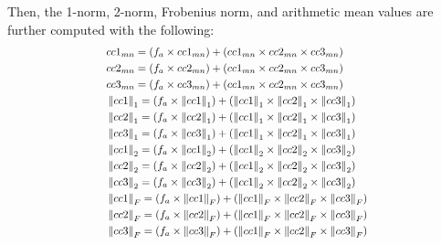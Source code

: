 \documentclass[superscriptaddress,longbibliography,aps,prl,twocolumn,10pt]{revtex4-2}
\newcommand{\norm}[1]{\left\lVert#1\right\rVert}
\begin{document}
\noindent
Then, the 1-norm, 2-norm, Frobenius norm, and arithmetic mean values are further computed with the following:
    \begin{equation} \label{eq:altogether}
    \scalebox{0.85}{\(\displaystyle
    \begin{aligned}
        &cc1_{mn} = \left( f_{a} \times cc1_{mn} \right) + \left( cc1_{mn} \times cc2_{mn} \times cc3_{mn} \right) \\ 
        &cc2_{mn} = \left( f_{a} \times cc2_{mn} \right) + \left( cc1_{mn} \times cc2_{mn} \times cc3_{mn} \right) \\
        &cc3_{mn} = \left( f_{a} \times cc3_{mn} \right) + \left( cc1_{mn} \times cc2_{mn} \times cc3_{mn} \right) \\
        &\norm{cc1}_{1} = \left( f_{a} \times \norm{cc1}_{1} \right) + \left( \norm{cc1}_{1} \times \norm{cc2}_{1} \times \norm{cc3}_{1} \right) \\ 
        &\norm{cc2}_{1} = \left( f_{a} \times \norm{cc2}_{1} \right) + \left( \norm{cc1}_{1} \times \norm{cc2}_{1} \times \norm{cc3}_{1} \right) \\
        &\norm{cc3}_{1} = \left( f_{a} \times \norm{cc3}_{1} \right) + \left( \norm{cc1}_{1} \times \norm{cc2}_{1} \times \norm{cc3}_{1} \right) \\
        &\norm{cc1}_{2} = \left(f_{a} \times \norm{cc1}_{2} \right) + \left( \norm{cc1}_{2} \times \norm{cc2}_{2} \times \norm{cc3}_{2} \right) \\ 
        &\norm{cc2}_{2} = \left( f_{a} \times \norm{cc2}_{2} \right) + \left( \norm{cc1}_{2} \times \norm{cc2}_{2} \times \norm{cc3}_{2} \right) \\
        &\norm{cc3}_{2} = \left( f_{a} \times \norm{cc3}_{2} \right) + \left( \norm{cc1}_{2} \times \norm{cc2}_{2} \times \norm{cc3}_{2} \right) \\
        &\norm{cc1}_{F} = \left( f_{a} \times \norm{cc1}_{F} \right) + \left( \norm{cc1}_{F} \times \norm{cc2}_{F} \times \norm{cc3}_{F} \right) \\
        &\norm{cc2}_{F} = \left( f_{a} \times \norm{cc2}_{F} \right) + \left( \norm{cc1}_{F} \times \norm{cc2}_{F} \times \norm{cc3}_{F} \right) \\
        &\norm{cc3}_{F} = \left( f_{a} \times \norm{cc3}_{F} \right) + \left( \norm{cc1}_{F} \times \norm{cc2}_{F} \times \norm{cc3}_{F} \right)
    \end{aligned}
    \)}
    \end{equation}
\end{document}
